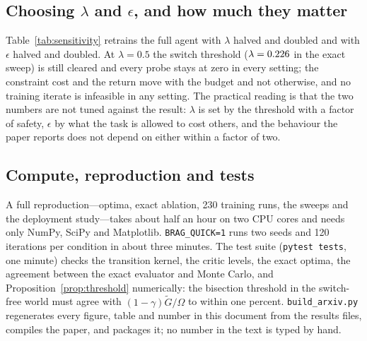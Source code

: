 \subsection{Choosing $\lambda$ and $\epsilon$, and how much they matter}
Table~\ref{tab:sensitivity} retrains the full agent with $\lambda$ halved and doubled and with $\epsilon$ halved and doubled.
At $\lambda=0.5$ the switch threshold ($\lambda=0.226$ in the exact sweep) is still cleared and every probe stays at zero in every setting; the constraint cost and the return move with the budget and not otherwise, and no training iterate is infeasible in any setting.
The practical reading is that the two numbers are not tuned against the result: $\lambda$ is set by the threshold with a factor of safety, $\epsilon$ by what the task is allowed to cost others, and the behaviour the paper reports does not depend on either within a factor of two.

\begin{table}[h]
\centering\footnotesize\setlength{\tabcolsep}{4pt}
\caption{Sensitivity of the trained full agent to the enlightenment coefficient and the budget (10 seeds each; exact values of the final policies; ``infeasible'' is the fraction of iterates above that run's own budget).}
\label{tab:sensitivity}

\end{table}

\subsection{Compute, reproduction and tests}
A full reproduction---optima, exact ablation, 230 training runs, the sweeps and the deployment study---takes about half an hour on two CPU cores and needs only NumPy, SciPy and Matplotlib.
\texttt{BRAG\_QUICK=1} runs two seeds and 120 iterations per condition in about three minutes.
The test suite (\texttt{pytest tests}, one minute) checks the transition kernel, the critic levels, the exact optima, the agreement between the exact evaluator and Monte Carlo, and Proposition~\ref{prop:threshold} numerically: the bisection threshold in the switch-free world must agree with $(1-\gamma)\tilde G/\Omega$ to within one percent.
\texttt{build\_arxiv.py} regenerates every figure, table and number in this document from the results files, compiles the paper, and packages it; no number in the text is typed by hand.
